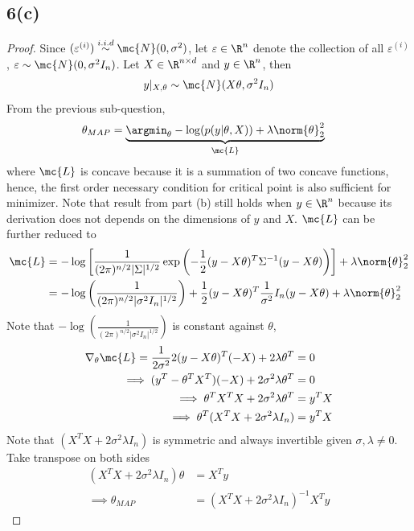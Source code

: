 \documentclass[11pt]{article}
\newcommand{\upi}[0]{^{(i)}}
\begin{document}
	\newpage
	\subsection{6(c)}
	\begin{proof}
		Since $(\varepsilon\upi) \overset{i.i.d}{\sim} \mc{N}(0, \sigma^2)$, let $\varepsilon \in \R^n$ denote the collection of all $\varepsilon\upi$, $\varepsilon \sim \mc{N}(0, \sigma^2 I_n)$. Let $X \in \R^{n \times d}$ and $y \in \R^n$, then 
		\begin{align}
			y|_{X, \theta} \sim \mc{N}(X \theta, \sigma^2 I_n)
		\end{align}
		From the previous sub-question,
		\begin{align}
			\theta_{MAP} &= \underbrace{\argmin_\theta - \log(p(y|\theta, X)) + \lambda \norm{\theta}_2^2}_{\mc{L}}
		\end{align}
		where $\mc{L}$ is concave because it is a summation of two concave functions, hence, the first order necessary condition for critical point is also sufficient for minimizer. Note that result from part (b) still holds when $y \in \R^n$ because its derivation does not depends on the dimensions of $y$ and $X$. $\mc{L}$ can be further reduced to
		\begin{align}
			\mc{L} &= - \log \left [
			\frac{1}{(2\pi)^{n/2} |\Sigma|^{1/2}} \exp \left (
			- \frac{1}{2} (y - X \theta)^T \Sigma^{-1} (y - X \theta)
			\right )
			\right] + \lambda \norm{\theta}_2^2 \\
			&= - \log \left (
			\frac{1}{(2\pi)^{n/2} |\sigma^2 I_n|^{1/2}}
			\right )
			+ \frac{1}{2} (y - X \theta)^T \frac{1}{\sigma^2} I_n (y - X \theta) 
			+ \lambda \norm{\theta}_2^2
		\end{align}
		Note that $- \log \left (
			\frac{1}{(2\pi)^{n/2} |\sigma^2 I_n|^{1/2}}
			\right )$ is constant against $\theta$, 
		\begin{align}
			\nabla_\theta \mc{L} = \frac{1}{2 \sigma^2} 2 (y - X\theta)^T (-X) + 2 \lambda \theta^T &= 0 \\
			\implies (y^T - \theta^T X^T)(-X) + 2 \sigma^2 \lambda \theta^T &= 0 \\
			\implies \theta^T X^TX + 2 \sigma^2 \lambda \theta^T&= y^T X \\
			\implies \theta^T (X^T X + 2 \sigma^2 \lambda I_n) &= y^T X
		\end{align}
		Note that $(X^T X + 2 \sigma^2 \lambda I_n)$ is symmetric and always invertible given $\sigma, \lambda \neq 0$. Take transpose on both sides
		\begin{align}
			(X^T X + 2 \sigma^2 \lambda I_n) \theta &= X^T y \\
			\implies \theta_{MAP} &= (X^T X + 2 \sigma^2 \lambda I_n)^{-1} X^T y
		\end{align}
	\end{proof}
	
\end{document}
